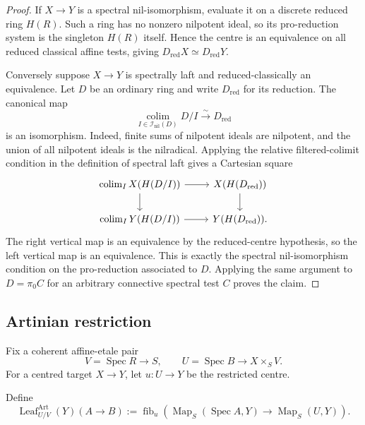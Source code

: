 \begin{proof}
If $X\to Y$ is a spectral nil-isomorphism, evaluate it on a discrete reduced
ring $H(R)$.  Such a ring has no nonzero nilpotent ideal, so its pro-reduction
system is the singleton $H(R)$ itself.  Hence the centre is an equivalence on
all reduced classical affine tests, giving
$D_{\mathrm{red}}X\simeq D_{\mathrm{red}}Y$.

Conversely suppose $X\to Y$ is spectrally laft and reduced-classically an
equivalence.  Let $D$ be an ordinary ring and write $D_{\mathrm{red}}$ for its
reduction.  The canonical map
\[
    \operatorname*{colim}_{I\in\mathcal I_{\mathrm{nil}}(D)}D/I
    \xrightarrow{\sim}
    D_{\mathrm{red}}
\]
is an isomorphism.  Indeed, finite sums of nilpotent ideals are nilpotent, and
the union of all nilpotent ideals is the nilradical.  Applying the relative
filtered-colimit condition in the definition of spectral laft gives a
Cartesian square
\[
\begin{tikzcd}
\operatorname*{colim}_I X(H(D/I)) \arrow[r] \arrow[d] &
X(H(D_{\mathrm{red}})) \arrow[d]\\
\operatorname*{colim}_I Y(H(D/I)) \arrow[r] &
Y(H(D_{\mathrm{red}})).
\end{tikzcd}
\]
The right vertical map is an equivalence by the reduced-centre hypothesis, so
the left vertical map is an equivalence.  This is exactly the spectral
nil-isomorphism condition on the pro-reduction associated to $D$.  Applying
the same argument to $D=\pi_0C$ for an arbitrary connective spectral test $C$
proves the claim.
\end{proof}

\subsection{Artinian restriction}

Fix a coherent affine-etale pair
\[
    V=\operatorname{Spec}R\longrightarrow S,
    \qquad
    U=\operatorname{Spec}B\longrightarrow X\times_SV.
\]
For a centred target $X\to Y$, let $u:U\to Y$ be the restricted centre.

\begin{definition}
\label{def:bnli-artinian-leaf}
Define
\[
    \operatorname{Leaf}^{\mathrm{Art}}_{U/V}(Y)(A\to B)
    :=
    \operatorname{fib}_{u}
    \left(
       \operatorname{Map}_S(\operatorname{Spec}A,Y)
       \longrightarrow
       \operatorname{Map}_S(U,Y)
    \right).
\]
\end{definition}

